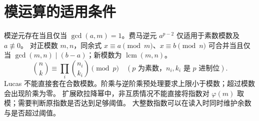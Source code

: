 \section{模运算的适用条件}
模逆元存在当且仅当 $\gcd(a,m)=1$。费马逆元 $a^{p-2}$ 仅适用于素数模数及 $a\not\equiv0$。
对正模数 $m,n$，同余式 $x\equiv a\pmod m$、$x\equiv b\pmod n$ 可合并当且仅当
$\gcd(m,n)\mid(b-a)$；新模数为 $\operatorname{lcm}(m,n)$。
\[
\binom nk\equiv\prod_i\binom{n_i}{k_i}\pmod p\quad(p\text{ 为素数，}n_i,k_i\text{ 是 }p\text{ 进制位}).
\]
Lucas 不能直接套在合数模数。阶乘与逆阶乘预处理要求上限小于模数；超过模数会出现阶乘为零。
扩展欧拉降幂中，非互质情况不能直接将指数对 $\varphi(m)$ 取模；需要判断原指数是否达到足够阈值。
大整数指数可以在读入时同时维护余数与是否超过阈值。

